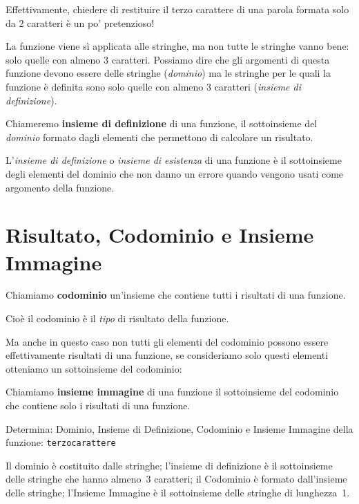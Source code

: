 Effettivamente, chiedere di restituire il terzo carattere di una parola 
formata solo da 2 caratteri è un po' pretenzioso!

La funzione viene sì applicata alle stringhe, ma non 
tutte le stringhe vanno bene: solo quelle con almeno 3 caratteri. 
Possiamo dire che gli argomenti di questa funzione devono essere delle 
stringhe (\emph{dominio}) ma le stringhe per le quali la funzione è 
definita sono solo quelle con almeno 3 caratteri 
(\emph{insieme di definizione}).

\begin{definizione}
Chiameremo \textbf{insieme di definizione}  di una funzione, il 
sottoinsieme del \emph{dominio} formato dagli elementi che permettono di 
calcolare un risultato.
\end{definizione}

L'\emph{insieme di definizione} o \emph{insieme di esistenza} di una 
funzione è il sottoinsieme degli elementi del dominio che non danno un 
errore quando vengono usati come argomento della funzione.

\section{Risultato, Codominio e Insieme Immagine}
\label{sec:funzioni2_codominio}

\begin{definizione}
Chiamiamo \textbf{codominio} un'insieme che contiene tutti i risultati di 
una funzione.
\end{definizione}

Cioè il codominio è il \emph{tipo} di risultato della funzione.

Ma anche in questo caso non tutti gli elementi del codominio possono essere 
effettivamente risultati di una funzione, se consideriamo solo questi 
elementi otteniamo un sottoinsieme del codominio:

\begin{definizione}
Chiamiamo \textbf{insieme immagine} di una funzione il sottoinsieme del 
codominio che contiene solo i risultati di una funzione.
\end{definizione}

\begin{esempio}
Determina: Dominio, Insieme di Definizione, Codominio e Insieme Immagine 
della funzione: \texttt{terzocarattere} 

Il dominio è costituito dalle stringhe; l'insieme di definizione è il 
sottoinsieme delle stringhe che hanno almeno~3 caratteri; il Codominio è 
formato dall'insieme delle stringhe; l'Insieme Immagine è il sottoinsieme 
delle stringhe di lunghezza~1.
\end{esempio}

